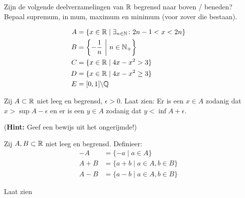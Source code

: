 \documentclass[week=1]{homework}
\date{\today}
\begin{document}
    \maketitle
    \thispagestyle{empty}
    \newpage
    \begin{questions}
		\let\firstquestion\question
		\renewcommand*{\question}{\vspace{7mm}\firstquestion}
        \firstquestion
        
        Zijn de volgende deelverzamelingen van $\mathbb{R}$ begrensd naar boven / beneden?
        Bepaal supremum, inmum, maximum en minimum (voor zover die bestaan).
        
        \begin{align*}
        	A &= \{ x \in \mathbb{R} \mid \exists_{n \in \mathbb{N}} \colon 2n-1 < x < 2n \} \\
        	B &= \left\{ - \frac{1}{n} \ \middle| \ n \in \mathbb{N}_+ \right\} \\
        	C &= \{ x \in \mathbb{R} \mid 4x - x^2 > 3 \} \\
        	D &= \{ x \in \mathbb{R} \mid 4x - x^2 \geq 3 \} \\
        	E &= [0,1]\backslash \mathbb{Q}
        \end{align*}
        
        
        \question
        Zij $A \subset \mathbb{R}$ niet leeg en begrensd, $\epsilon > 0$. Laat zien: Er is een $x \in A$ zodanig dat $x > \sup A - \epsilon$ en er is een $y \in A$ zodanig dat $y < \inf A + \epsilon$.
        
        (\textbf{Hint:} Geef een bewijs uit het ongerijmde!)
        
        
        \question
        
        Zij $A,B \subset \mathbb{R}$ niet leeg en begrensd. Definieer:
        \begin{align*}
	        -A &= \{-a \mid a \in A\} \\
		    A + B &= \{a + b \mid a \in A, b \in B\} \\
			A - B &= \{a - b \mid a \in A, b \in B\}
        \end{align*}
        
        Laat zien
        \begin{parts}

\end{parts}
\end{questions}
\end{document}
